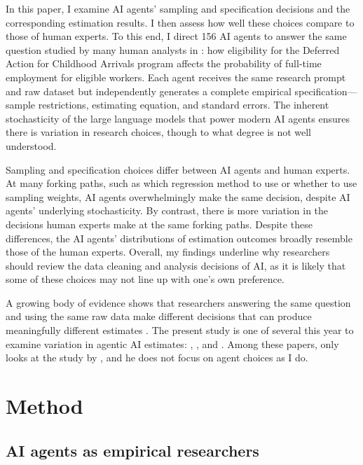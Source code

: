 \documentclass[
  12pt]{article}
\begin{document}
In this paper, I examine AI agents' sampling and specification decisions
and the corresponding estimation results. I then assess how well these
choices compare to those of human experts. To this end, I direct 156 AI
agents to answer the same question studied by many human analysts in
\citet{huntingtonklein2025sources}: how eligibility for the Deferred
Action for Childhood Arrivals program affects the probability of
full-time employment for eligible workers. Each agent receives the same
research prompt and raw dataset but independently generates a complete
empirical specification---sample restrictions, estimating equation, and
standard errors. The inherent stochasticity of the large language models
that power modern AI agents ensures there is variation in research
choices, though to what degree is not well understood.

Sampling and specification choices differ between AI agents and human
experts. At many forking paths, such as which regression method to use
or whether to use sampling weights, AI agents overwhelmingly make the
same decision, despite AI agents' underlying stochasticity. By contrast,
there is more variation in the decisions human experts make at the same
forking paths. Despite these differences, the AI agents' distributions
of estimation outcomes broadly resemble those of the human experts.
Overall, my findings underline why researchers should review the data
cleaning and analysis decisions of AI, as it is likely that some of
these choices may not line up with one's own preference.

A growing body of evidence shows that researchers answering the same
question and using the same raw data make different decisions that can
produce meaningfully different estimates
\citep{silberzahn2018many, huntington2021influence, breznau2022observing}.
The present study is one of several this year to examine variation in
agentic AI estimates: \citet{gao2026nonstandard},
\citet{grundl2026comparison}, and \citet{huang2026aierrors}. Among these
papers, only \citet{grundl2026comparison} looks at the study by
\citet{huntingtonklein2025sources}, and he does not focus on agent
choices as I do.

\section{Method}\label{sec-method}

\subsection{AI agents as empirical
researchers}\label{ai-agents-as-empirical-researchers}
\end{document}
